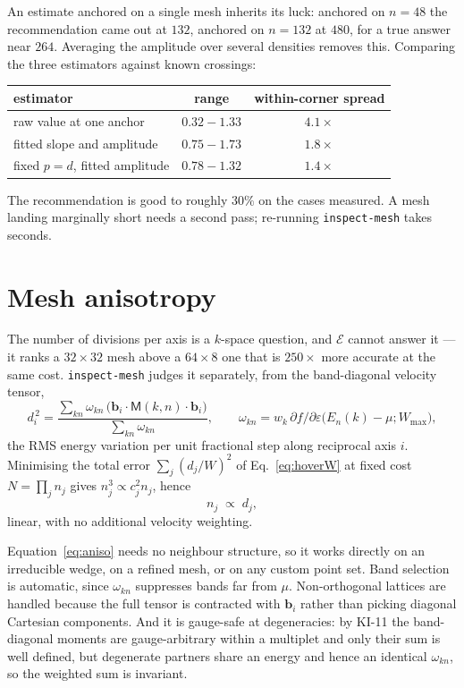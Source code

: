 \documentclass[11pt,a4paper]{article}
\newcommand{\dfda}{\partial f/\partial\varepsilon}
\newcommand{\code}[1]{\texttt{#1}}
\begin{document}
\noindent
An estimate anchored on a single mesh inherits its luck: anchored on $n=48$ the
recommendation came out at $132$, anchored on $n=132$ at $480$, for a true
answer near $264$. Averaging the amplitude over several densities removes this.
Comparing the three estimators against known crossings:

\begin{center}
\begin{tabular}{lcc}
\toprule
estimator & range & within-corner spread \\
\midrule
raw value at one anchor        & $0.32 - 1.33$ & $4.1\times$ \\
fitted slope and amplitude     & $0.75 - 1.73$ & $1.8\times$ \\
fixed $p=d$, fitted amplitude  & $0.78 - 1.32$ & $1.4\times$ \\
\bottomrule
\end{tabular}
\end{center}

\noindent
The recommendation is good to roughly $30\%$ on the cases measured. A mesh
landing marginally short needs a second pass; re-running \code{inspect-mesh}
takes seconds.

\section{Mesh anisotropy}
\label{sec:anisotropy}

The number of divisions per axis is a $k$-space question, and $\mathcal{E}$
cannot answer it --- it ranks a $32\times32$ mesh above a $64\times8$ one that
is $250\times$ more accurate at the same cost. \code{inspect-mesh} judges it
separately, from the band-diagonal velocity tensor,
\begin{equation}
  d_i^{\,2}
  = \frac{\sum_{kn}\omega_{kn}\,
          \bigl(\mathbf{b}_i\cdot \mathsf{M}(k,n)\cdot \mathbf{b}_i\bigr)}
         {\sum_{kn}\omega_{kn}},
  \qquad
  \omega_{kn} = w_k \, \dfda\bigl(E_n(k)-\mu; W_\text{max}\bigr),
  \label{eq:aniso}
\end{equation}
the RMS energy variation per unit fractional step along reciprocal axis $i$.
Minimising the total error $\sum_j (d_j/W)^2$ of Eq.~\eqref{eq:hoverW} at
fixed cost $N=\prod_j n_j$ gives $n_j^3 \propto c_j^2 n_j$, hence
\begin{equation}
  n_j \;\propto\; d_j ,
\end{equation}
linear, with no additional velocity weighting.

Equation~\eqref{eq:aniso} needs no neighbour structure, so it works directly on
an irreducible wedge, on a refined mesh, or on any custom point set. Band
selection is automatic, since $\omega_{kn}$ suppresses bands far from $\mu$.
Non-orthogonal lattices are handled because the full tensor is contracted with
$\mathbf{b}_i$ rather than picking diagonal Cartesian components. And it is
gauge-safe at degeneracies: by KI-11 the band-diagonal moments are
gauge-arbitrary within a multiplet and only their sum is well defined, but
degenerate partners share an energy and hence an identical $\omega_{kn}$, so
the weighted sum is invariant.
\end{document}
